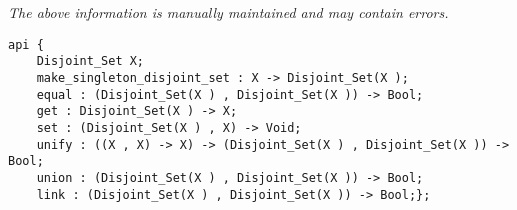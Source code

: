 \label{api:Disjoint\_Sets\_With\_Constant\_Time\_Union}

{\tiny \it The above information is manually maintained and may contain errors.}
\begin{verbatim}
api {
    Disjoint_Set X;
    make_singleton_disjoint_set : X -> Disjoint_Set(X );
    equal : (Disjoint_Set(X ) , Disjoint_Set(X )) -> Bool;
    get : Disjoint_Set(X ) -> X;
    set : (Disjoint_Set(X ) , X) -> Void;
    unify : ((X , X) -> X) -> (Disjoint_Set(X ) , Disjoint_Set(X )) -> Bool;
    union : (Disjoint_Set(X ) , Disjoint_Set(X )) -> Bool;
    link : (Disjoint_Set(X ) , Disjoint_Set(X )) -> Bool;};
\end{verbatim}

